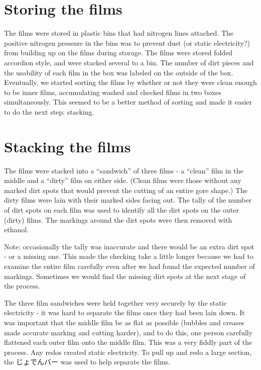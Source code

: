 \documentclass{article}
\begin{document}
\section{Storing the films}
The films were stored in plastic bins that had nitrogen lines attached. The positive nitrogen pressure in the bins was to prevent dust  (or static electricity?) from building up on the films during storage. %
The films were stored folded accordion style, and were stacked several to a bin. The number of dirt pieces and the usability of each film in the box was labeled on the outside of the box. Eventually, we started sorting the films by whether or not they were clean enough to be inner films, accumulating washed and checked films in two boxes simultaneously.  This seemed to be a better method of sorting and made it easier to do the next step: stacking. 

\section{Stacking the films}
The films were stacked into a ``sandwich'' of three films - a ``clean'' film in the middle and a ``dirty'' film on either side. (Clean films were those without any marked dirt spots that would prevent the cutting of an entire gore shape.) The dirty films were lain with their marked sides facing out. 
The tally of the number of dirt spots on each film was used to identify all the dirt spots on the outer (dirty) films. The markings around the dirt spots were then removed with ethanol. 

Note: occasionally the tally was inaccurate and there would be an extra dirt spot - or a missing one. This made the checking take a little longer because we had to examine the entire film carefully even after we had found the expected number of markings. Sometimes we would find the missing dirt spots at the next stage of the process.

The three film sandwiches were held together very securely by the static electricity - it was hard to separate the films once they had been lain down. It was important that the middle film be as flat as possible (bubbles and creases made accurate marking and cutting harder), and to do this, one person carefully flattened each outer film onto the middle film. This was a very fiddly part of the process. Any redos created static electricity. To pull up and redo a large section, the じょでんバー was used to help separate the films. 
\end{document}
